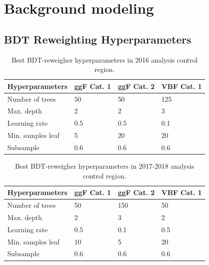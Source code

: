\chapter{Background modeling} \label{appendix:bkgmodel}

\section{BDT Reweighting Hyperparameters}

\begin{table}[htbp!]
\centering
\caption[Best BDT-reweigher hyperparameters in 2016 analysis control region]{\label{bkg:tab:bdtregparameters2016}Best BDT-reweigher hyperparameters in 2016 analysis control region.}
\begin{tabularx}{\textwidth}{lXXX}
    \hline 
    Hyperparameters           & ggF Cat. 1     & ggF Cat. 2    &  VBF  Cat. 1 \\
    \hline
    \small Number of trees    & \small  50   & \small 50   & \small  125  \\
    \small Max. depth         & \small  2    & \small  2   & \small  3    \\
    \small Learning rate      & \small 0.5   & \small 0.5  & \small  0.1  \\
    \small Min. samples leaf  & \small  5    & \small 20   & \small  20   \\
    \small Subsample          & \small 0.6   & \small 0.6  & \small 0.6   \\
    \hline
\end{tabularx}
\end{table}

\begin{table}[htbp!]
\centering
\caption[Best BDT-reweigher hyperparameters in 2017-2018 analysis control region]{\label{bkg:tab:bdtregparameters20172018}Best BDT-reweigher hyperparameters in 2017-2018 analysis control region.}
\begin{tabularx}{\textwidth}{lXXX}
    \hline 
    Hyperparameters           & ggF Cat. 1     & ggF Cat. 2    &  VBF  Cat. 1 \\
    \hline
    \small Number of trees    & \small  50   & \small 150   & \small  50   \\
    \small Max. depth         & \small  2    & \small  3   & \small  2    \\
    \small Learning rate      & \small 0.5   & \small  0.1 & \small  0.5  \\
    \small Min. samples leaf  & \small 10   & \small 5  & \small 20   \\
    \small Subsample          & \small 0.6   & \small 0.6  & \small 0.6   \\
    \hline
\end{tabularx}
\end{table}

